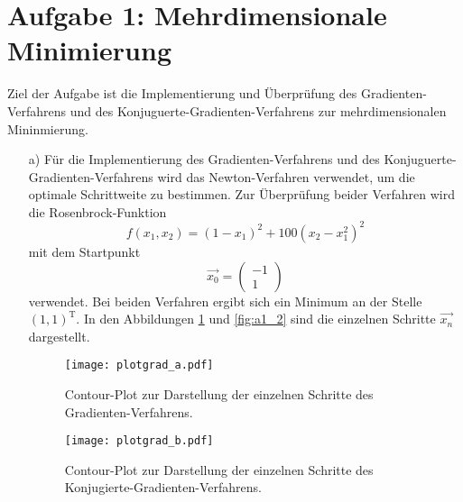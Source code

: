 



\maketitle

\section*{Aufgabe 1: Mehrdimensionale Minimierung}
Ziel der Aufgabe ist die Implementierung und Überprüfung des Gradienten-Verfahrens und des Konjuguerte-Gradienten-Verfahrens zur mehrdimensionalen Mininmierung.
\begin{itemize}[leftmargin=*]
\item[a)] Für die Implementierung des Gradienten-Verfahrens und des Konjuguerte-Gradienten-Verfahrens wird das
          Newton-Verfahren verwendet, um die optimale Schrittweite zu bestimmen.
          Zur Überprüfung beider Verfahren wird die Rosenbrock-Funktion
          \begin{equation*}
            f\left(x_1, x_2\right) = \left(1 - x_1\right)^2 + 100 \left(x_2 - x_1^2\right)^2
          \end{equation*}
          mit dem Startpunkt
          \begin{equation*}
            \vec{x_0} = \begin{pmatrix}
              -1 \\
              1
          \end{pmatrix}
          \end{equation*}
          verwendet. Bei beiden Verfahren ergibt sich ein Minimum an der Stelle $(1, 1)^{\text{T}}$. In den Abbildungen \ref{fig:a1_1}  und \ref{fig:a1_2} sind die einzelnen Schritte $\vec{x_n}$ dargestellt.
          \FloatBarrier
          \begin{figure}[H]
              \centering
              \texttt{[image: plotgrad\_a.pdf]}
              \caption{Contour-Plot zur Darstellung der einzelnen Schritte des Gradienten-Verfahrens.}
              \label{fig:a1_1}
          \end{figure}
          \FloatBarrier
          \noindent
          \FloatBarrier
          \begin{figure}[H]
              \centering
              \texttt{[image: plotgrad\_b.pdf]}
              \caption{Contour-Plot zur Darstellung der einzelnen Schritte des Konjugierte-Gradienten-Verfahrens.}

\end{figure}
\end{itemize}
